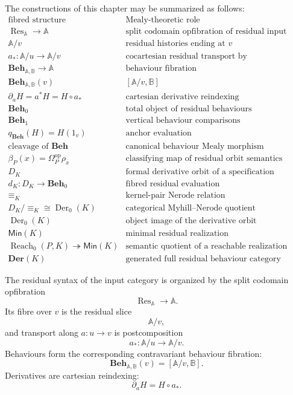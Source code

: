 The constructions of this chapter may be summarized as follows:
\[
\begin{array}{c|l}
\text{fibred structure} & \text{Mealy-theoretic role} \\
\hline
\operatorname{Res}_{\mathbb A}\to\mathbb A
&
\text{split codomain opfibration of residual input syntax}
\\
\mathbb A/v
&
\text{residual histories ending at }v
\\
a_*:\mathbb A/u\to\mathbb A/v
&
\text{cocartesian residual transport by postcomposition}
\\
\mathbf{Beh}_{\mathbb A,\mathbb B}\to\mathbb A
&
\text{behaviour fibration}
\\
\mathbf{Beh}_{\mathbb A,\mathbb B}(v)
&
[\mathbb A/v,\mathbb B]
\\
\partial_aH=a^*H=H\circ a_*
&
\text{cartesian derivative reindexing}
\\
\mathbf{Beh}_0
&
\text{total object of residual behaviours}
\\
\mathbf{Beh}_1
&
\text{vertical behaviour comparisons}
\\
q_{\mathbf{Beh}}(H)=H(1_v)
&
\text{anchor evaluation}
\\
\text{cleavage of }\mathbf{Beh}
&
\text{canonical behaviour Mealy morphism}
\\
\beta_P(x)=\Omega_P^{\mathrm{op}}\rho_x
&
\text{classifying map of residual orbit semantics}
\\
D_K
&
\text{formal derivative orbit of a specification}
\\
d_K:D_K\to\mathbf{Beh}_0
&
\text{fibred residual evaluation}
\\
{\equiv_K}
&
\text{kernel-pair Nerode relation}
\\
D_K/{\equiv_K}\cong \operatorname{Der}_0(K)
&
\text{categorical Myhill--Nerode quotient}
\\
\operatorname{Der}_0(K)
&
\text{object image of the derivative orbit}
\\
\mathsf{Min}(K)
&
\text{minimal residual realization}
\\
\operatorname{Reach}_0(P,K)\twoheadrightarrow \mathsf{Min}(K)
&
\text{semantic quotient of a reachable realization}
\\
\mathbf{Der}(K)
&
\text{generated full residual behaviour category}
\end{array}
\]

The residual syntax of the input category is organized by the split codomain
opfibration
\[
    \operatorname{Res}_{\mathbb A}\to\mathbb A.
\]
Its fibre over \(v\) is the residual slice
\[
    \mathbb A/v,
\]
and transport along \(a:u\to v\) is postcomposition
\[
    a_*:\mathbb A/u\to\mathbb A/v.
\]
Behaviours form the corresponding contravariant behaviour fibration:
\[
    \mathbf{Beh}_{\mathbb A,\mathbb B}(v)
    =
    [\mathbb A/v,\mathbb B].
\]
Derivatives are cartesian reindexing:
\[
    \partial_aH=H\circ a_*.
\]

